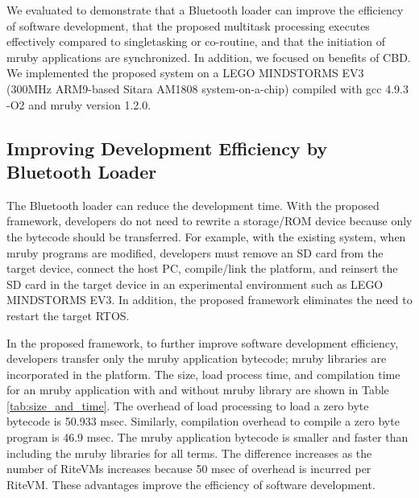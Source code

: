 \documentclass[conference]{IEEEtran/IEEEtran/IEEEtran}
\begin{document}
We evaluated to demonstrate that a Bluetooth loader can improve the efficiency of software development, that the proposed multitask processing executes effectively compared to singletasking or co-routine, and that the initiation of mruby applications are synchronized.
In addition, we focused on benefits of CBD.
We implemented the proposed system on a LEGO MINDSTORMS EV3 \cite{par:EV3} (300MHz ARM9-based Sitara AM1808 system-on-a-chip) compiled with gcc 4.9.3 -O2 and mruby version 1.2.0.

\subsection{Improving Development Efficiency by Bluetooth Loader}
The Bluetooth loader can reduce the development time.
With the proposed framework, developers do not need to rewrite a storage/ROM device because only the bytecode should be transferred.
For example, with the existing system, when mruby programs are modified, developers must remove an SD card from the target device, connect the host PC, compile/link the platform, and reinsert the SD card in the target device in an experimental environment such as LEGO MINDSTORMS EV3.
In addition, the proposed framework eliminates the need to restart the target RTOS.

In the proposed framework, to further improve software development efficiency, developers transfer only the mruby application bytecode; mruby libraries are incorporated in the platform.
The size, load process time, and compilation time for an mruby application with and without mruby library are shown in Table \ref{tab:size_and_time}.
The overhead of load processing to load a zero byte bytecode is 50.933 msec.
Similarly, compilation overhead to compile a zero byte program is 46.9 msec.
The mruby application bytecode is smaller and faster than including the mruby libraries for all terms.
The difference increases as the number of RiteVMs increases because 50 msec of overhead is incurred per RiteVM. 
These advantages improve the efficiency of software development.
\end{document}
